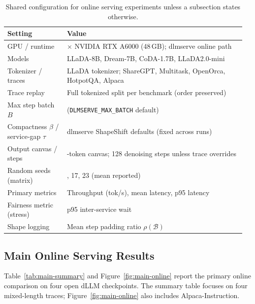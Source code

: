 \documentclass[a4paper]{llncs}
\begin{document}
\begin{table}[t]
\centering
\caption{Shared configuration for online serving experiments unless a subsection states otherwise.}
\label{tab:exp-config}
\scriptsize
\setlength{\tabcolsep}{3pt}
\begin{tabular}{@{}>{\raggedright\arraybackslash}p{0.24\linewidth}>{\raggedright\arraybackslash}p{0.72\linewidth}@{}}
\toprule
Setting & Value \\
\midrule
GPU / runtime & 1$\times$ NVIDIA RTX A6000 (48\,GB); dlmserve online path \\
Models & LLaDA-8B, Dream-7B, CoDA-1.7B, LLaDA2.0-mini \\
Tokenizer / traces & LLaDA tokenizer; ShareGPT, Multitask, OpenOrca, HotpotQA, Alpaca \\
Trace replay & Full tokenized split per benchmark (order preserved) \\
Max step batch $B$ & 8 (\texttt{DLMSERVE\_MAX\_BATCH} default) \\
Compactness $\beta$ / service-gap $\tau$ & dlmserve ShapeShift defaults (fixed across runs) \\
Output canvas / steps & 128-token canvas; 128 denoising steps unless trace overrides \\
Random seeds (matrix) & 13, 17, 23 (mean reported) \\
Primary metrics & Throughput (tok/s), mean latency, p95 latency \\
Fairness metric (stress) & p95 inter-service wait \\
Shape logging & Mean step padding ratio $\rho(\mathcal{B})$ \\
\bottomrule
\end{tabular}
\end{table}

\subsection{Main Online Serving Results}

Table~\ref{tab:main-summary} and Figure~\ref{fig:main-online} report the primary online comparison on four open dLLM checkpoints. The summary table focuses on four mixed-length traces; Figure~\ref{fig:main-online} also includes Alpaca-Instruction.
\end{document}

